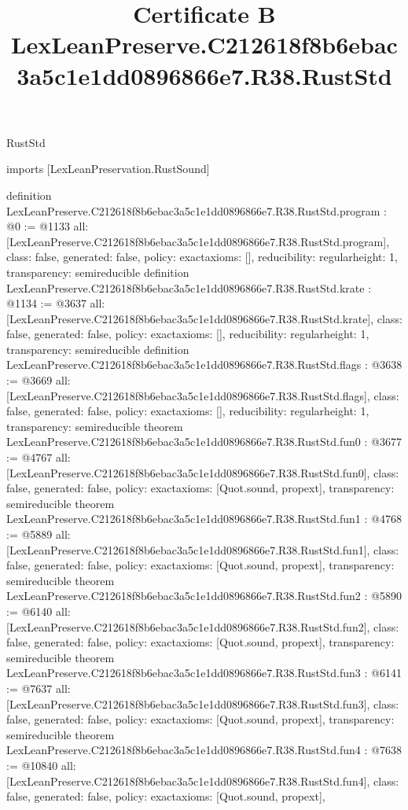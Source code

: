 \begin{lexlean}{RustStd}
\title{Certificate B LexLeanPreserve.C212618f8b6ebac3a5c1e1dd0896866e7.R38.RustStd}
\begin{coremodule}
imports [LexLeanPreservation.RustSound]

definition LexLeanPreserve.C212618f8b6ebac3a5c1e1dd0896866e7.R38.RustStd.program : @0 := @1133 {
  all: [LexLeanPreserve.C212618f8b6ebac3a5c1e1dd0896866e7.R38.RustStd.program],
  class: false,
  generated: false,
  policy: exact{axioms: []},
  reducibility: regular{height: 1},
  transparency: semireducible
}
definition LexLeanPreserve.C212618f8b6ebac3a5c1e1dd0896866e7.R38.RustStd.krate : @1134 := @3637 {
  all: [LexLeanPreserve.C212618f8b6ebac3a5c1e1dd0896866e7.R38.RustStd.krate],
  class: false,
  generated: false,
  policy: exact{axioms: []},
  reducibility: regular{height: 1},
  transparency: semireducible
}
definition LexLeanPreserve.C212618f8b6ebac3a5c1e1dd0896866e7.R38.RustStd.flags : @3638 := @3669 {
  all: [LexLeanPreserve.C212618f8b6ebac3a5c1e1dd0896866e7.R38.RustStd.flags],
  class: false,
  generated: false,
  policy: exact{axioms: []},
  reducibility: regular{height: 1},
  transparency: semireducible
}
theorem LexLeanPreserve.C212618f8b6ebac3a5c1e1dd0896866e7.R38.RustStd.fun0 : @3677 := @4767 {
  all: [LexLeanPreserve.C212618f8b6ebac3a5c1e1dd0896866e7.R38.RustStd.fun0],
  class: false,
  generated: false,
  policy: exact{axioms: [Quot.sound, propext]},
  transparency: semireducible
}
theorem LexLeanPreserve.C212618f8b6ebac3a5c1e1dd0896866e7.R38.RustStd.fun1 : @4768 := @5889 {
  all: [LexLeanPreserve.C212618f8b6ebac3a5c1e1dd0896866e7.R38.RustStd.fun1],
  class: false,
  generated: false,
  policy: exact{axioms: [Quot.sound, propext]},
  transparency: semireducible
}
theorem LexLeanPreserve.C212618f8b6ebac3a5c1e1dd0896866e7.R38.RustStd.fun2 : @5890 := @6140 {
  all: [LexLeanPreserve.C212618f8b6ebac3a5c1e1dd0896866e7.R38.RustStd.fun2],
  class: false,
  generated: false,
  policy: exact{axioms: [Quot.sound, propext]},
  transparency: semireducible
}
theorem LexLeanPreserve.C212618f8b6ebac3a5c1e1dd0896866e7.R38.RustStd.fun3 : @6141 := @7637 {
  all: [LexLeanPreserve.C212618f8b6ebac3a5c1e1dd0896866e7.R38.RustStd.fun3],
  class: false,
  generated: false,
  policy: exact{axioms: [Quot.sound, propext]},
  transparency: semireducible
}
theorem LexLeanPreserve.C212618f8b6ebac3a5c1e1dd0896866e7.R38.RustStd.fun4 : @7638 := @10840 {
  all: [LexLeanPreserve.C212618f8b6ebac3a5c1e1dd0896866e7.R38.RustStd.fun4],
  class: false,
  generated: false,
  policy: exact{axioms: [Quot.sound, propext]},
}
\end{coremodule}
\end{lexlean}

